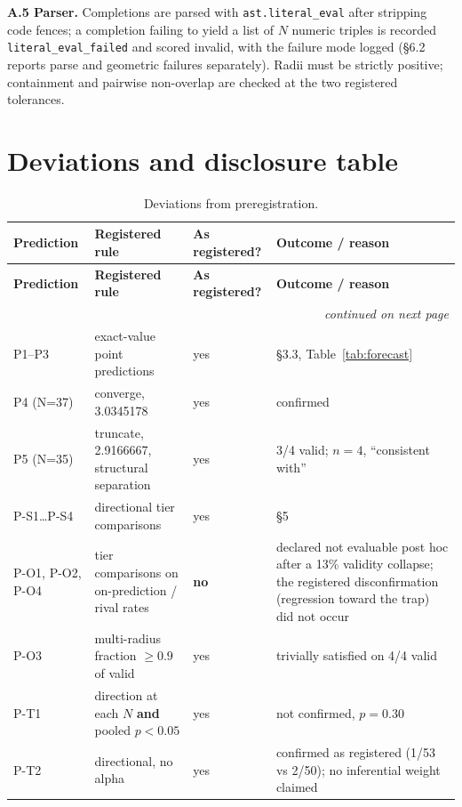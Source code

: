 \textbf{A.5 Parser.} Completions are parsed with \texttt{ast.literal\_eval} after stripping code fences; a
completion failing to yield a list of $N$ numeric triples is recorded \texttt{literal\_eval\_failed} and
scored invalid, with the failure mode logged (\S6.2 reports parse and geometric failures
separately). Radii must be strictly positive; containment and pairwise non-overlap are checked
at the two registered tolerances.

\section{Deviations and disclosure table}

\begingroup
\scriptsize
\begin{longtable}{@{}p{}p{}p{}p{}@{}}
\caption{Deviations from preregistration.}\label{tab:deviations}\\
\toprule
\textbf{Prediction} & \textbf{Registered rule} & \textbf{As registered?} & \textbf{Outcome / reason} \\
\midrule
\endfirsthead
\toprule
\textbf{Prediction} & \textbf{Registered rule} & \textbf{As registered?} & \textbf{Outcome / reason} \\
\midrule
\endhead
\midrule
\multicolumn{4}{r}{\emph{continued on next page}} \\
\endfoot
\bottomrule
\endlastfoot
P1--P3 & exact-value point predictions & yes & \S3.3, Table~\ref{tab:forecast} \\
P4 (N=37) & converge, 3.0345178 & yes & confirmed \\
P5 (N=35) & truncate, 2.9166667, structural separation & yes & 3/4 valid; $n = 4$, ``consistent with'' \\
P-S1\ldots P-S4 & directional tier comparisons & yes & \S5 \\
P-O1, P-O2, P-O4 & tier comparisons on on-prediction / rival rates & \textbf{no} & declared not evaluable post hoc after a 13\% validity collapse; the registered disconfirmation (regression toward the trap) did not occur \\
P-O3 & multi-radius fraction $\ge 0.9$ of valid & yes & trivially satisfied on 4/4 valid \\
P-T1 & direction at each $N$ \textbf{and} pooled $p < 0.05$ & yes & not confirmed, $p = 0.30$ \\
P-T2 & directional, no alpha & yes & confirmed as registered (1/53 vs 2/50); no inferential weight claimed \\

\end{longtable}
